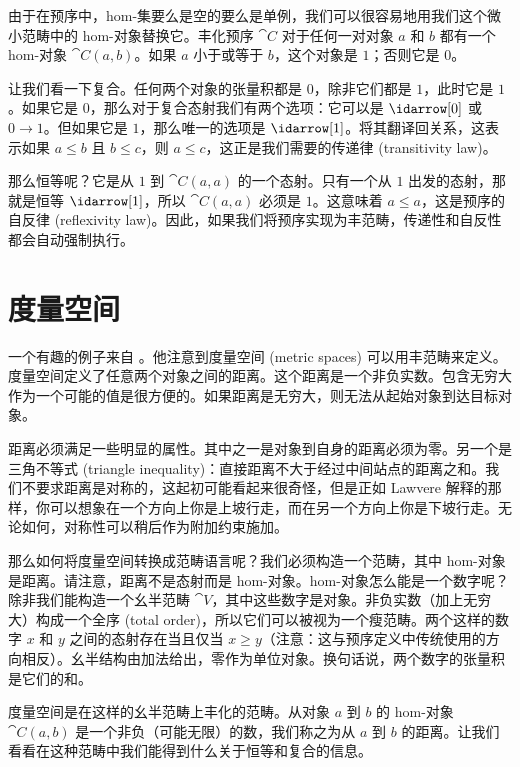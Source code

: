 由于在预序中，hom-集要么是空的要么是单例，我们可以很容易地用我们这个微小范畴中的 hom-对象替换它。丰化预序 $\cat{C}$ 对于任何一对对象 $a$ 和 $b$ 都有一个 hom-对象 $\cat{C}(a, b)$。如果 $a$ 小于或等于 $b$，这个对象是 $1$；否则它是 $0$。

让我们看一下复合。任何两个对象的张量积都是 $0$，除非它们都是 $1$，此时它是 $1$。如果它是 $0$，那么对于复合态射我们有两个选项：它可以是 $\idarrow[0]$ 或 $0 \to 1$。但如果它是 $1$，那么唯一的选项是 $\idarrow[1]$。将其翻译回关系，这表示如果 $a \leqslant b$ 且 $b \leqslant c$，则 $a \leqslant c$，这正是我们需要的传递律 (transitivity law)。

那么恒等呢？它是从 $1$ 到 $\cat{C}(a, a)$ 的一个态射。只有一个从 $1$ 出发的态射，那就是恒等 $\idarrow[1]$，所以 $\cat{C}(a, a)$ 必须是 $1$。这意味着 $a \leqslant a$，这是预序的自反律 (reflexivity law)。因此，如果我们将预序实现为丰范畴，传递性和自反性都会自动强制执行。

\section{度量空间}

一个有趣的例子来自 。他注意到度量空间 (metric spaces) 可以用丰范畴来定义。度量空间定义了任意两个对象之间的距离。这个距离是一个非负实数。包含无穷大作为一个可能的值是很方便的。如果距离是无穷大，则无法从起始对象到达目标对象。

距离必须满足一些明显的属性。其中之一是对象到自身的距离必须为零。另一个是三角不等式 (triangle inequality)：直接距离不大于经过中间站点的距离之和。我们不要求距离是对称的，这起初可能看起来很奇怪，但是正如 Lawvere 解释的那样，你可以想象在一个方向上你是上坡行走，而在另一个方向上你是下坡行走。无论如何，对称性可以稍后作为附加约束施加。

那么如何将度量空间转换成范畴语言呢？我们必须构造一个范畴，其中 hom-对象是距离。请注意，距离不是态射而是 hom-对象。hom-对象怎么能是一个数字呢？除非我们能构造一个幺半范畴 $\cat{V}$，其中这些数字是对象。非负实数（加上无穷大）构成一个全序 (total order)，所以它们可以被视为一个瘦范畴。两个这样的数字 $x$ 和 $y$ 之间的态射存在当且仅当 $x \geqslant y$（注意：这与预序定义中传统使用的方向相反）。幺半结构由加法给出，零作为单位对象。换句话说，两个数字的张量积是它们的和。

度量空间是在这样的幺半范畴上丰化的范畴。从对象 $a$ 到 $b$ 的 hom-对象 $\cat{C}(a, b)$ 是一个非负（可能无限）的数，我们称之为从 $a$ 到 $b$ 的距离。让我们看看在这种范畴中我们能得到什么关于恒等和复合的信息。

